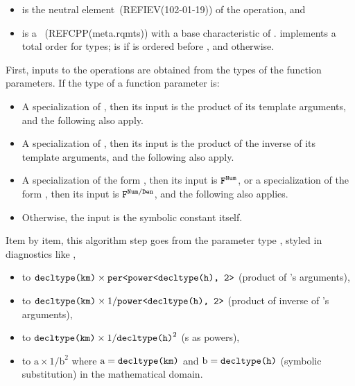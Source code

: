 \begin{itemdescr}
\pnum
\mandates
\begin{itemize}
\item
{} is the neutral element~(REFIEV(102-01-19)) of the operation, and
\item
{} is a ~(REFCPP(meta.rqmts))
with a base characteristic of .
 implements a total order for types;
 is  if  is ordered before , and  otherwise.
\end{itemize}

\pnum
\effects
\pnum
First, inputs to the operations are obtained from the types of the function parameters.
If the type of a function parameter is:
\begin{itemize}
\item
A specialization of ,
then its input is the product of its template arguments, and
the following also apply.
\item
A specialization of ,
then its input is the product of the inverse of its template arguments, and
the following also apply.
\item
A specialization of the form ,
then its input is $\texttt{\protect F}^{\texttt{\protect Num}}$, or
a specialization of the form ,
then its input is $\texttt{\protect F}^{\texttt{\protect Num}/\texttt{\protect Den}}$, and
the following also applies.
\item
Otherwise, the input is the symbolic constant itself.
\end{itemize}
\begin{example}
Item by item, this algorithm step goes from the \Cpp{} parameter type
,
styled in diagnostics like
,
\begin{itemize}
\item
to $\texttt{\protect decltype(km)} \times \texttt{\protect per<power<decltype(h), 2>}$ (product of 's arguments),
\item
to $\texttt{\protect decltype(km)} \times 1/\texttt{\protect power<decltype(h), 2>}$ (product of inverse of 's arguments),
\item
to $\texttt{\protect decltype(km)} \times 1/\texttt{\protect decltype(h)}^2$ (s as powers),
\item
to $\textrm{a} \times 1/\textrm{b}^2$ where $\textrm{a} = \texttt{\protect decltype(km)}$ and $\textrm{b} = \texttt{\protect decltype(h)}$ (symbolic substitution)
in the mathematical domain.
\end{itemize}
\end{example}


\end{itemdescr}
